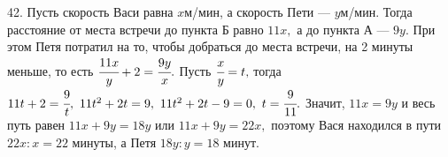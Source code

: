 42. Пусть скорость Васи равна $x$м/мин, а скорость Пети --- $y$м/мин. Тогда расстояние от места встречи до пункта Б равно $11x,$ а до пункта А --- $9y.$ При этом Петя потратил на то, чтобы добраться до места встречи, на 2 минуты меньше, то есть $\cfrac{11x}{y}+2=\cfrac{9y}{x}.$ Пусть $\cfrac{x}{y}=t,$ тогда $11t+2=\cfrac{9}{t},\ 11t^2+2t=9,\ 11t^2+2t-9=0,\ t=\cfrac{9}{11}.$ Значит, $11x=9y$ и весь путь равен $11x+9y=18y$ или $11x+9y=22x,$ поэтому Вася находился в пути $22x:x=22$ минуты, а Петя $18y:y=18$ минут.\\
